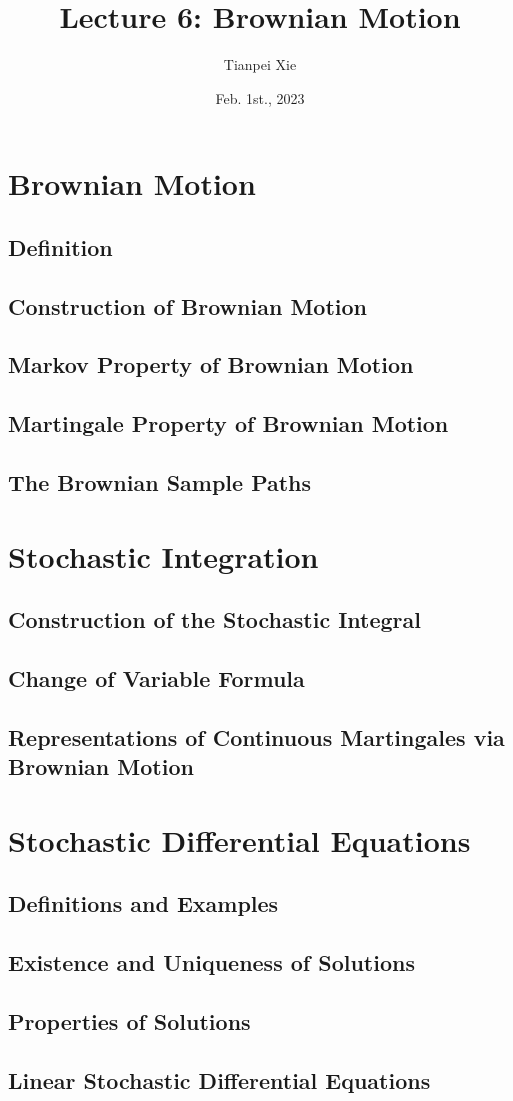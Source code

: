 \documentclass[11pt]{article}
\begin{document}
\title{Lecture 6: Brownian Motion}
\author{ Tianpei Xie}
\date{Feb. 1st., 2023}
\maketitle
\tableofcontents
\newpage
\section{Brownian Motion}
\subsection{Definition}
\subsection{Construction of Brownian Motion}
\subsection{Markov Property of Brownian Motion}
\subsection{Martingale Property of Brownian Motion}
\subsection{The Brownian Sample Paths}

\section{Stochastic Integration}
\subsection{Construction of the Stochastic Integral}
\subsection{Change of Variable Formula}
\subsection{Representations of Continuous Martingales via Brownian Motion}

\section{Stochastic Differential Equations}
\subsection{Definitions and Examples}
\subsection{Existence and Uniqueness of Solutions}
\subsection{Properties of Solutions}
\subsection{Linear Stochastic Differential Equations}
\newpage


\end{document}
